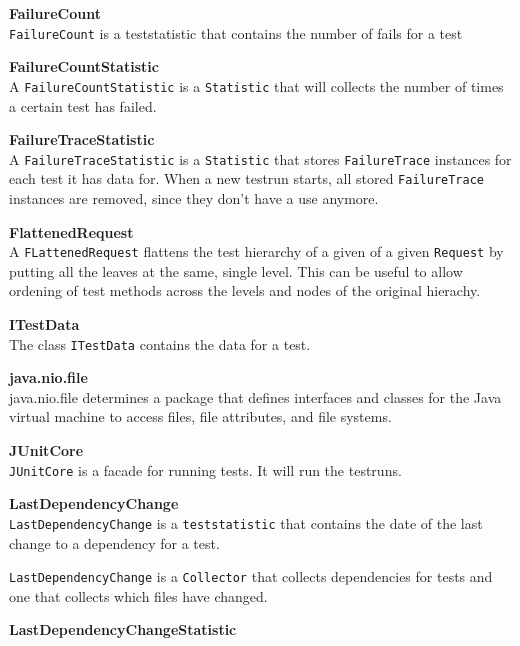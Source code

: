 \documentclass[i2]{oss}
\newcommand{\class}[1]{\texttt{#1}}
\newcommand{\gloss}[1]{\textbf{#1}}
\begin{document}
\begin{description}
\item \gloss{FailureCount} \\ 
\class{FailureCount} is a teststatistic that contains the number of fails for a test

\item \gloss{FailureCountStatistic}\\
A \class{FailureCountStatistic} is a \class{Statistic} that will collects the number of times a certain test has failed.

\item \gloss{FailureTraceStatistic}\\
A \class{FailureTraceStatistic} is a \class{Statistic} that stores \class{FailureTrace} instances for each test it has data for. When a new testrun starts, all stored \class{FailureTrace} instances are removed, since they don't have a use anymore.
	

\item \gloss{FlattenedRequest}\\
A \class{FLattenedRequest} flattens the test hierarchy of a given of a given \class{Request} by putting all the leaves at the same, single level. This can be useful to allow ordening of test methods across the levels and nodes of the original hierachy.

\item \gloss{ITestData} \\
The class \class{ITestData} contains the data for a test.

\item \gloss{java.nio.file} \\
java.nio.file determines a package that defines interfaces and classes for the Java virtual machine to access files, file attributes, and file systems.

\item \gloss{JUnitCore} \\
\class{JUnitCore} is a facade for running tests. It will run the testruns.

\item \gloss{LastDependencyChange} \\
\class{LastDependencyChange} is a \class{teststatistic} that contains the date of the last change to a dependency for a test.

\class{LastDependencyChange} is a \class{Collector} that collects dependencies for tests and one that collects which files have changed.

\item \gloss{LastDependencyChangeStatistic} \\


\end{description}
\end{document}

